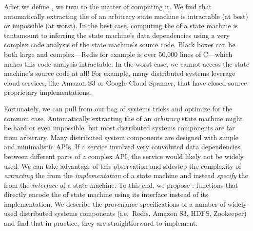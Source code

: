 After we define \watprovenance{}, we turn to the matter of computing it. We find
that automatically extracting the \watprovenance{} of an arbitrary state
machine is intractable (at best) or impossible (at worst). In the best case,
computing the \watprovenance{} of a state machine is tantamount to inferring
the state machine's data dependencies using a very complex code analysis of the
state machine's source code. Black boxes
can be both large and complex---Redis
for example is over 50,000 lines of C---which makes this code analysis
intractable. In the worst case, we cannot access the state machine's source
code at all! For example, many distributed systems leverage cloud services,
like Amazon S3 or Google Cloud Spanner, that have closed-source proprietary
implementations.

Fortunately, we can pull from our bag of systems tricks and optimize for the
common case. Automatically extracting the \watprovenance{} of an
\emph{arbitrary} state machine might be hard or even impossible, but most
distributed systems components are far from arbitrary. Many distributed system
components are designed with simple and minimalistic APIs. If a service
involved very convoluted data dependencies between different parts of a complex
API, the service would likely not be widely used. We can take advantage of this
observation and sidestep the complexity of \emph{extracting} the
\watprovenance{} from the \emph{implementation} of a state machine and instead
\emph{specify} the \watprovenance{} from the \emph{interface} of a state
machine. To this end, we propose :
functions that directly encode the \watprovenance{} of state machine using its
interface instead of its implementation.  We describe the provenance
specifications of a number of widely used distributed systems components
(i.e.\ Redis, Amazon S3, HDFS, Zookeeper) and find that in practice, they are
straightforward to implement.

